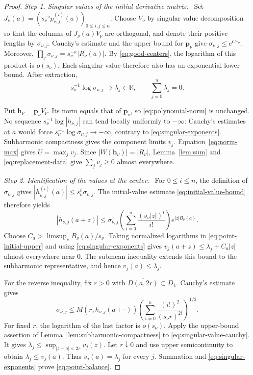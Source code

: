 \documentclass[11pt,letterpaper,reqno]{amsart}
\theoremstyle{remark}
\numberwithin{equation}{section}
\newcommand{\R}{\mathbb R}
\newcommand{\pv}{\bm p}
\newcommand{\hv}{\bm h}
\newcommand{\step}[1]{\medskip\noindent\emph{#1}\ }
\begin{document}
\begin{proof}
\step{Step 1. Singular values of the initial derivative matrix.}
Set $J_\nu(a)=(s_\nu^{-i}p_{\nu,j}^{(i)}(a))_{0\leq i,j\leq n}$.
Choose $V_\nu$ by singular value decomposition so that the columns of
$J_\nu(a)V_\nu$ are orthogonal, and denote their positive lengths by
$\sigma_{\nu,j}$. Cauchy's estimate and the upper bound for $\pv_\nu$
give $\sigma_{\nu,j}\leq e^{Cs_\nu}$. Moreover,
$\prod_j\sigma_{\nu,j}=s_\nu^{-\kappa}|R_\nu(a)|$.
By \eqref{eq:good-centers}, the logarithm of this product is
$o(s_\nu)$. Each singular value therefore also has an exponential
lower bound. After extraction,
\begin{equation}\label{eq:singular-exponents}
 s_\nu^{-1}\log\sigma_{\nu,j}\longrightarrow\lambda_j\in\R,
 \qquad \sum_{j=0}^{n}\lambda_j=0.
\end{equation}

Put $\hv_\nu=\pv_\nu V_\nu$. Its norm equals that of $\pv_\nu$, so
\eqref{eq:polynomial-norm} is unchanged. No sequence
$s_\nu^{-1}\log|h_{\nu,j}|$ can tend locally uniformly to $-\infty$:
Cauchy's estimates at $a$ would force
$s_\nu^{-1}\log\sigma_{\nu,j}\to-\infty$, contrary to
\eqref{eq:singular-exponents}. Subharmonic compactness gives the
component limits $v_j$. Equation~\eqref{eq:norm-max} gives
$U=\max_jv_j$. Since $|W(\hv_\nu)|=|R_\nu|$,
Lemma~\ref{lem:sum} and \eqref{eq:replacement-data} give
$\sum_jv_j\geq0$ almost everywhere.

\step{Step 2. Identification of the values at the center.}
For $0\leq i\leq n$, the definition of $\sigma_{\nu,j}$ gives
$|h_{\nu,j}^{(i)}(a)|\leq s_\nu^i\sigma_{\nu,j}$.
The initial-value estimate \eqref{eq:initial-value-bound} therefore yields
\begin{equation}\label{eq:point-initial-upper}
 |h_{\nu,j}(a+z)|
 \leq\sigma_{\nu,j}
 \left(\sum_{i=0}^{n}\frac{(s_\nu|z|)^i}{i!}\right)
 e^{|z|B_\nu(a)}.
\end{equation}
Choose $C_a>\limsup_\nu B_\nu(a)/s_\nu$.
Taking normalized logarithms in \eqref{eq:point-initial-upper} and using
\eqref{eq:singular-exponents} gives
$v_j(a+z)\leq\lambda_j+C_a|z|$ almost everywhere near $0$.
The submean inequality extends this bound to the subharmonic
representative, and hence $v_j(a)\leq\lambda_j$.

For the reverse inequality, fix $r>0$ with
$\overline{D(a,2r)}\subset D_4$. Cauchy's estimate gives
\begin{equation}\label{eq:singular-value-cauchy}
 \sigma_{\nu,j}\leq M(r,h_{\nu,j}(a+\cdot))
 \left(\sum_{i=0}^{n}\frac{(i!)^2}{(s_\nu r)^{2i}}\right)^{1/2}.
\end{equation}
For fixed $r$, the logarithm of the last factor is $o(s_\nu)$.
Apply the upper-bound assertion of
Lemma~\ref{lem:subharmonic-compactness} to
\eqref{eq:singular-value-cauchy}. It gives
$\lambda_j\leq\sup_{|z-a|<2r}v_j(z)$.
Let $r\downarrow0$ and use upper semicontinuity to obtain
$\lambda_j\leq v_j(a)$. Thus $v_j(a)=\lambda_j$ for every $j$.
Summation and \eqref{eq:singular-exponents} prove
\eqref{eq:point-balance}.
\end{proof}
\end{document}
